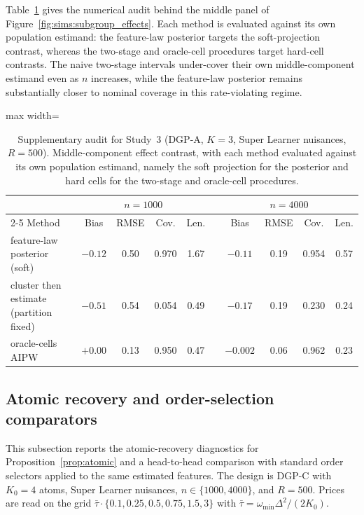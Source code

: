 \documentclass[11pt]{article}
\begin{document}
Table~\ref{tab:sims:own_estimands} gives the numerical audit behind the middle panel of Figure~\ref{fig:sims:subgroup_effects}.  Each method is evaluated against its own population estimand: the feature-law posterior targets the soft-projection contrast, whereas the two-stage and oracle-cell procedures target hard-cell contrasts.  The naive two-stage intervals under-cover their own middle-component estimand even as $n$ increases, while the feature-law posterior remains substantially closer to nominal coverage in this rate-violating regime.  

\begin{table}[t]
\centering
\caption{Supplementary audit for Study~3 (DGP-A, $K=3$, Super Learner nuisances, $R=500$). Middle-component effect contrast, with each method evaluated against its own population estimand, namely the soft projection for the posterior and hard cells for the two-stage and oracle-cell procedures.}
\label{tab:sims:own_estimands}
\begin{adjustbox}{max width=\textwidth}
\begin{tabular}{l cccc c cccc}
\toprule
& \multicolumn{4}{c}{$n=1000$} & & \multicolumn{4}{c}{$n=4000$}\\
\cmidrule{2-5}\cmidrule{7-10}
Method & Bias & RMSE & Cov. & Len. & & Bias & RMSE & Cov. & Len.\\
\midrule
feature-law posterior (soft) & $-0.12$ & 0.50 & 0.970 & 1.67 & & $-0.11$ & 0.19 & 0.954 & 0.57\\
cluster then estimate (partition fixed) & $-0.51$ & 0.54 & 0.054 & 0.49 & & $-0.17$ & 0.19 & 0.230 & 0.24\\
oracle-cells AIPW & $+0.00$ & 0.13 & 0.950 & 0.47 & & $-0.002$ & 0.06 & 0.962 & 0.23\\
\bottomrule
\end{tabular}
\end{adjustbox}
\end{table}


\subsection{Atomic recovery and order-selection comparators}\label{sec:sims:atomic_supp}

This subsection reports the atomic-recovery diagnostics for Proposition~\ref{prop:atomic} and a head-to-head comparison with standard order selectors applied to the same estimated features. The design is DGP-C with $K_0=4$ atoms, Super Learner nuisances, $n\in\{1000,4000\}$, and $R=500$. Prices are read on the grid $\bar\tau\cdot\{0.1,0.25,0.5,0.75,1.5,3\}$ with $\bar\tau=\omega_{\min}\Delta^2/(2K_0)$.
\end{document}
